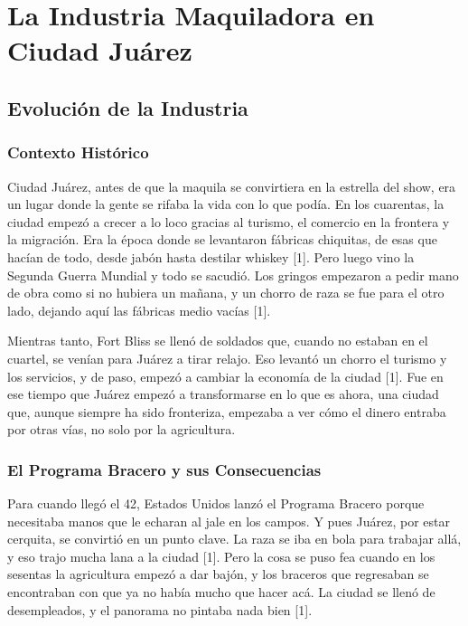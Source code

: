 \documentclass[
  letterpaper,
]{book}
\begin{document}
\chapter{La Industria Maquiladora en Ciudad
Juárez}\label{la-industria-maquiladora-en-ciudad-juuxe1rez}

\section{Evolución de la Industria}\label{evoluciuxf3n-de-la-industria}

\subsection{Contexto Histórico}\label{contexto-histuxf3rico}

Ciudad Juárez, antes de que la maquila se convirtiera en la estrella del
show, era un lugar donde la gente se rifaba la vida con lo que podía. En
los cuarentas, la ciudad empezó a crecer a lo loco gracias al turismo,
el comercio en la frontera y la migración. Era la época donde se
levantaron fábricas chiquitas, de esas que hacían de todo, desde jabón
hasta destilar whiskey {[}1{]}. Pero luego vino la Segunda Guerra
Mundial y todo se sacudió. Los gringos empezaron a pedir mano de obra
como si no hubiera un mañana, y un chorro de raza se fue para el otro
lado, dejando aquí las fábricas medio vacías {[}1{]}.

Mientras tanto, Fort Bliss se llenó de soldados que, cuando no estaban
en el cuartel, se venían para Juárez a tirar relajo. Eso levantó un
chorro el turismo y los servicios, y de paso, empezó a cambiar la
economía de la ciudad {[}1{]}. Fue en ese tiempo que Juárez empezó a
transformarse en lo que es ahora, una ciudad que, aunque siempre ha sido
fronteriza, empezaba a ver cómo el dinero entraba por otras vías, no
solo por la agricultura.

\subsection{El Programa Bracero y sus
Consecuencias}\label{el-programa-bracero-y-sus-consecuencias}

Para cuando llegó el 42, Estados Unidos lanzó el Programa Bracero porque
necesitaba manos que le echaran al jale en los campos. Y pues Juárez,
por estar cerquita, se convirtió en un punto clave. La raza se iba en
bola para trabajar allá, y eso trajo mucha lana a la ciudad {[}1{]}.
Pero la cosa se puso fea cuando en los sesentas la agricultura empezó a
dar bajón, y los braceros que regresaban se encontraban con que ya no
había mucho que hacer acá. La ciudad se llenó de desempleados, y el
panorama no pintaba nada bien {[}1{]}.
\end{document}
